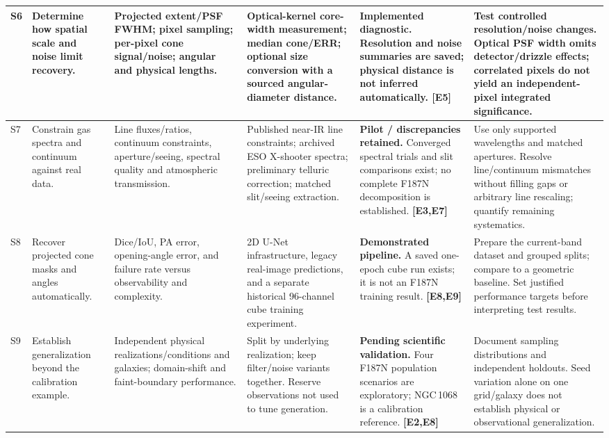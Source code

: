 \documentclass[10pt,letterpaper]{article}
\newcommand{\ev}[1]{\textcolor{ink}{\textbf{[#1]}}}
\newcommand{\status}[1]{\textbf{#1.}}
\begin{document}
\begin{landscape}
\begin{longtable}{P{0.35in}P{1.35in}P{1.60in}P{1.82in}P{1.78in}P{2.10in}}
S6 & Determine how spatial scale and noise limit recovery. &
Projected extent/PSF FWHM; pixel sampling; per-pixel cone signal/noise; angular and physical lengths. &
Optical-kernel core-width measurement; median cone/ERR; optional size conversion with a sourced angular-diameter distance. &
\status{Implemented diagnostic} Resolution and noise summaries are saved; physical distance is not inferred automatically. \ev{E5} &
Test controlled resolution/noise changes. Optical PSF width omits detector/drizzle effects; correlated pixels do not yield an independent-pixel integrated significance. \\[5pt]
\midrule

S7 & Constrain gas spectra and continuum against real data. &
Line fluxes/ratios, continuum constraints, aperture/seeing, spectral quality and atmospheric transmission. &
Published near-IR line constraints; archived ESO X-shooter spectra; preliminary telluric correction; matched slit/seeing extraction. &
\status{Pilot / discrepancies retained} Converged spectral trials and slit comparisons exist; no complete F187N decomposition is established. \ev{E3,E7} &
Use only supported wavelengths and matched apertures. Resolve line/continuum mismatches without filling gaps or arbitrary line rescaling; quantify remaining systematics. \\[5pt]
\midrule

S8 & Recover projected cone masks and angles automatically. &
Dice/IoU, PA error, opening-angle error, and failure rate versus observability and complexity. &
2D U-Net infrastructure, legacy real-image predictions, and a separate historical 96-channel cube training experiment. &
\status{Demonstrated pipeline} A saved one-epoch cube run exists; it is not an F187N training result. \ev{E8,E9} &
Prepare the current-band dataset and grouped splits; compare to a geometric baseline. Set justified performance targets before interpreting test results. \\[5pt]
\midrule

S9 & Establish generalization beyond the calibration example. &
Independent physical realizations/conditions and galaxies; domain-shift and faint-boundary performance. &
Split by underlying realization; keep filter/noise variants together. Reserve observations not used to tune generation. &
\status{Pending scientific validation} Four F187N population scenarios are exploratory; NGC\,1068 is a calibration reference. \ev{E2,E8} &
Document sampling distributions and independent holdouts. Seed variation alone on one grid/galaxy does not establish physical or observational generalization. \\[5pt]
\midrule


\end{longtable}
\end{landscape}
\end{document}
